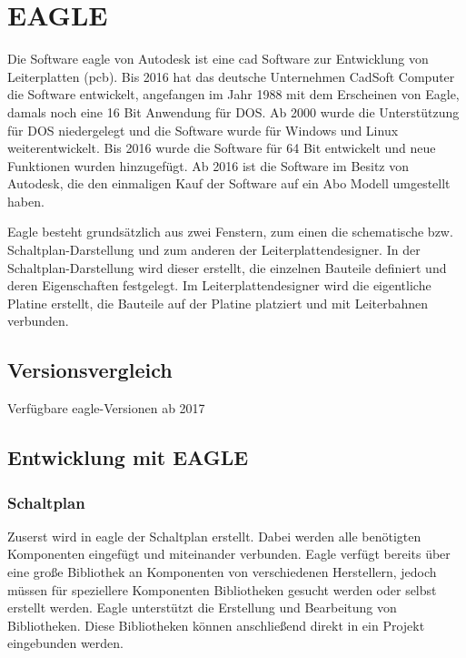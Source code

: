 \section{EAGLE}
Die Software \ac{eagle} von Autodesk ist eine \ac{cad} Software zur Entwicklung von Leiterplatten (\ac{pcb}).
Bis 2016 hat das deutsche Unternehmen CadSoft Computer die Software entwickelt, angefangen im Jahr 1988 mit dem Erscheinen von Eagle, damals noch eine 16 Bit Anwendung für DOS.
Ab 2000 wurde die Unterstützung für DOS niedergelegt und die Software wurde für Windows und Linux weiterentwickelt.
Bis 2016 wurde die Software für 64 Bit entwickelt und neue Funktionen wurden hinzugefügt.
Ab 2016 ist die Software im Besitz von Autodesk, die den einmaligen Kauf der Software auf ein Abo Modell umgestellt haben.\par

Eagle besteht grundsätzlich aus zwei Fenstern, zum einen die schematische bzw. Schaltplan-Darstellung und zum anderen der Leiterplattendesigner.
In der Schaltplan-Darstellung wird dieser erstellt, die einzelnen Bauteile definiert und deren Eigenschaften festgelegt.
Im Leiterplattendesigner wird die eigentliche Platine erstellt, die Bauteile auf der Platine platziert und mit Leiterbahnen verbunden.
\subsection{Versionsvergleich}
\begin{table}[htbp]
	\centering
	
	\caption{Verfügbare \ac{eagle}-Versionen ab 2017 \cite[vgl.][]{autodesk-eagle}}
\end{table}

\subsection{Entwicklung mit EAGLE}
\subsubsection{Schaltplan}
Zuserst wird in \ac{eagle} der Schaltplan erstellt.
Dabei werden alle benötigten Komponenten eingefügt und miteinander verbunden.
Eagle verfügt bereits über eine große Bibliothek an Komponenten von verschiedenen Herstellern, jedoch müssen für speziellere Komponenten Bibliotheken gesucht werden oder selbst erstellt werden.
Eagle unterstützt die Erstellung und Bearbeitung von Bibliotheken.
Diese Bibliotheken können anschließend direkt in ein Projekt eingebunden werden.\par

